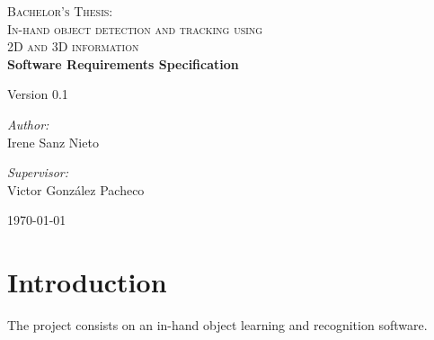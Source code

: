 \documentclass{article}
\begin{document}
\begin{titlepage}

\begin{center}
\textsc{\huge Bachelor's Thesis:\\[0.5cm]In-hand object detection and tracking using\\[0.5cm]2D and 3D
information }\\[4cm]


{\Huge\bfseries{Software Requirements Specification}\\[2cm]}

\Large{Version 0.1}
\\[11cm]


\begin{minipage}{0.55\textwidth}
\begin{flushleft} \large
\emph{Author:}\\
Irene Sanz Nieto\\
\end{flushleft}
\end{minipage}
\begin{minipage}{0.4\textwidth}
\begin{flushright} \large
\emph{Supervisor:}\\
Victor González Pacheco\end{flushright}\end{minipage}\vfill

{\large \today}

\end{center}
\end{titlepage}

%
\newpage
%
\tableofcontents
\newpage


\section{Introduction}
\hspace{0.5cm}The project consists on an in-hand object learning and recognition software. 
\\
\end{document}
